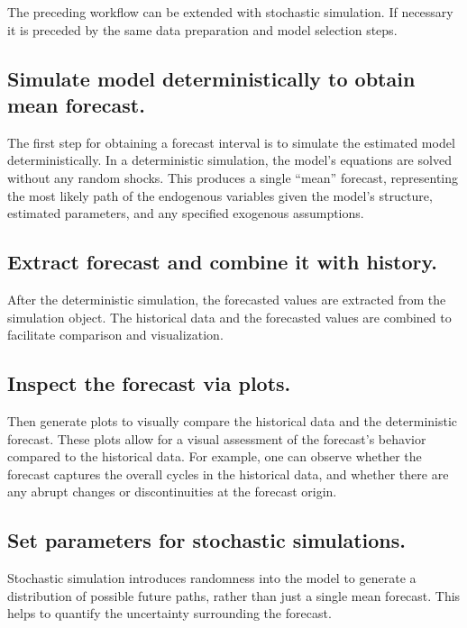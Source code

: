 \documentclass[
  letterpaper,
  DIV=11,
  numbers=noendperiod]{scrreport}
\begin{document}
The preceding workflow can be extended with stochastic simulation. If
necessary it is preceded by the same data preparation and model
selection steps.

\subsection{Simulate model deterministically to obtain mean
forecast.}\label{simulate-model-deterministically-to-obtain-mean-forecast.}

The first step for obtaining a forecast interval is to simulate the
estimated model deterministically. In a deterministic simulation, the
model's equations are solved without any random shocks. This produces a
single ``mean'' forecast, representing the most likely path of the
endogenous variables given the model's structure, estimated parameters,
and any specified exogenous assumptions.

\subsection{Extract forecast and combine it with
history.}\label{extract-forecast-and-combine-it-with-history.}

After the deterministic simulation, the forecasted values are extracted
from the simulation object. The historical data and the forecasted
values are combined to facilitate comparison and visualization.

\subsection{Inspect the forecast via
plots.}\label{inspect-the-forecast-via-plots.}

Then generate plots to visually compare the historical data and the
deterministic forecast. These plots allow for a visual assessment of the
forecast's behavior compared to the historical data. For example, one
can observe whether the forecast captures the overall cycles in the
historical data, and whether there are any abrupt changes or
discontinuities at the forecast origin.

\subsection{Set parameters for stochastic
simulations.}\label{set-parameters-for-stochastic-simulations.}

Stochastic simulation introduces randomness into the model to generate a
distribution of possible future paths, rather than just a single mean
forecast. This helps to quantify the uncertainty surrounding the
forecast.
\end{document}
